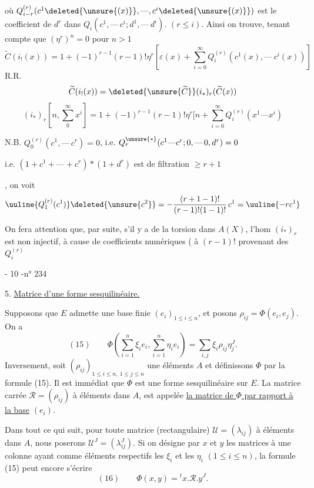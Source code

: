 où $Q_{i-r}^{(r)}(c^1\deleted{\unsure{(x)}},\text{---},c^i\deleted{\unsure{(x)}})$
est le coefficient de $d^r$ dans $Q_i(c^1,\text{---}\,c^i;d^1,\text{---}\,d^i)$.
$(r\leq i)$.
Ainsi on trouve, tenant compte que $(\eta^r)^n=0$ pour $n>1$
\[
\widetilde C(i_!(x))=1+(-1)^{r-1}(r-1)!\eta^r
\left[\varepsilon(x)+\sum_{i=0}^\infty Q_i^{(r)}(c^1(x),\text{---}\,c^i(x))\right]
\]
  R.R.
\[
\widetilde C(i_!(x))=\deleted{\unsure{\widetilde C}}(i_*)_r(\widetilde C(x))
\]
 
\[
(i_*)_r\left[n,\sum_0^\infty x^i\right]
=1+(-1)^{r-1}(r-1)!\eta^r\biggl[n+\sum_{i=0}^\infty Q_i^{(r)}(x^1\text{---}x^i)
\]

N.B. $Q_0^{(r)}(c^1,\text{---}\,c^r)=0$, i.e.
$Q_r^{\unsure{*}}(c^1\text{---}c^r;0,\text{---}\,0,d^r)=0$

i.e. $(1+c^1+\text{---}+c^r)*(1+d^r)$ est de filtration $\geq r+1$

, on voit
\[
\uuline{Q_1^{(r)}(c^1)}\deleted{\unsure{c^2}}
=-\frac{(r+1-1)!}{(r-1)!(1-1)!}\,c^1=\uuline{-rc^1}
\]

On fera attention que, par suite, s'il y a de la torsion dans $A(X)$,
l'hom $(i_*)_r$ est non injectif, à cause de  coefficients numériques
( à $(r-1)!$  provenant des $Q_i^{(r)}$


- 10 -\hfill n° 234

5. \uline{Matrice d'une forme sesquilinéaire.}

Supposons que $E$ admette une base finie $(e_i)_{1\leq i\leq n}$, et posons
$\rho_{ij}=\Phi(e_i,e_j)$. On a
\[
(15)\qquad
\Phi\left(\sum_{i=1}^n\xi_i e_i,\sum_{i=1}^n\eta_i e_i\right)
=\sum_{i,j}\xi_i\rho_{ij}\eta_j^J.
\]
Inversement, soit $(\rho_{ij})_{1\leq i\leq n,\ 1\leq j\leq n}$ une
 éléments  $A$
et définissons $\Phi$ par la formule (15). Il est immédiat que $\Phi$ est une forme sesquilinéaire sur $E$.
La matrice carrée $\mathcal R=(\rho_{ij})$ à éléments dans $A$, est appelée
\uline{la matrice de $\Phi$ par rapport à la base} $(e_i)$.

Dans tout ce qui suit, pour toute matrice (rectangulaire) $\mathcal U=(\lambda_{ij})$ à éléments dans $A$, nous poserons $\mathcal U^J=(\lambda_{ij}^J)$.
Si on désigne par $x$ et $y$ les matrices à une colonne ayant comme éléments respectifs les $\xi_i$ et les $\eta_i$ $(1\leq i\leq n)$, la formule (15) peut encore s'écrire
\[
(16)\qquad \Phi(x,y)={}^t x.\mathcal R.y^J.
\]

